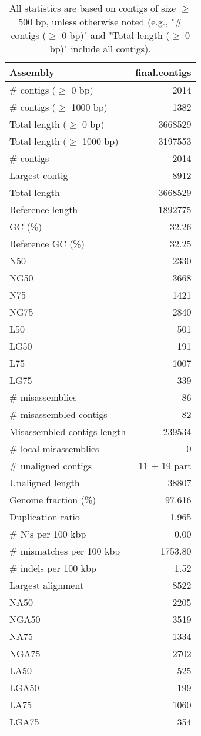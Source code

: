 \documentclass[12pt,a4paper]{article}
\begin{document}
\begin{table}[ht]
\begin{center}
\caption{All statistics are based on contigs of size $\geq$ 500 bp, unless otherwise noted (e.g., "\# contigs ($\geq$ 0 bp)" and "Total length ($\geq$ 0 bp)" include all contigs).}
\begin{tabular}{|l*{1}{|r}|}
\hline
Assembly & final.contigs \\ \hline
\# contigs ($\geq$ 0 bp) & 2014 \\ \hline
\# contigs ($\geq$ 1000 bp) & 1382 \\ \hline
Total length ($\geq$ 0 bp) & 3668529 \\ \hline
Total length ($\geq$ 1000 bp) & 3197553 \\ \hline
\# contigs & 2014 \\ \hline
Largest contig & 8912 \\ \hline
Total length & 3668529 \\ \hline
Reference length & 1892775 \\ \hline
GC (\%) & 32.26 \\ \hline
Reference GC (\%) & 32.25 \\ \hline
N50 & 2330 \\ \hline
NG50 & 3668 \\ \hline
N75 & 1421 \\ \hline
NG75 & 2840 \\ \hline
L50 & 501 \\ \hline
LG50 & 191 \\ \hline
L75 & 1007 \\ \hline
LG75 & 339 \\ \hline
\# misassemblies & 86 \\ \hline
\# misassembled contigs & 82 \\ \hline
Misassembled contigs length & 239534 \\ \hline
\# local misassemblies & 0 \\ \hline
\# unaligned contigs & 11 + 19 part \\ \hline
Unaligned length & 38807 \\ \hline
Genome fraction (\%) & 97.616 \\ \hline
Duplication ratio & 1.965 \\ \hline
\# N's per 100 kbp & 0.00 \\ \hline
\# mismatches per 100 kbp & 1753.80 \\ \hline
\# indels per 100 kbp & 1.52 \\ \hline
Largest alignment & 8522 \\ \hline
NA50 & 2205 \\ \hline
NGA50 & 3519 \\ \hline
NA75 & 1334 \\ \hline
NGA75 & 2702 \\ \hline
LA50 & 525 \\ \hline
LGA50 & 199 \\ \hline
LA75 & 1060 \\ \hline
LGA75 & 354 \\ \hline
\end{tabular}
\end{center}
\end{table}
\end{document}
